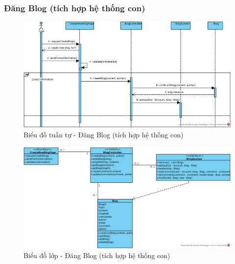 \documentclass[./../main.tex]{subfiles}
\begin{document}
\subsubsection{Đăng Blog (tích hợp hệ thống con)}
\begin{figure}[H]
	\centering
	\includegraphics[width=\linewidth]{./images/UseCaseDesignDiagram/ucr_ss_create_blog.eps}
	\caption{Biểu đồ tuần tự - Đăng Blog (tích hợp hệ thống con)}
\end{figure}
\begin{figure}[H]
	\centering
	\includegraphics[width=\linewidth]{./images/UseCaseDesignDiagram/ucd_ss_blog.eps}
	\caption{Biểu đồ lớp - Đăng Blog (tích hợp hệ thống con)}
\end{figure}
\end{document}

